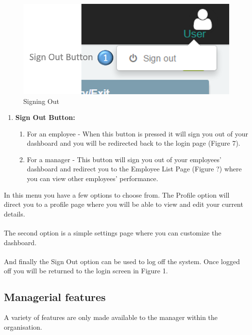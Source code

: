 \documentclass[11pt,a4paper]{article}
\begin{document}
\begin{figure}[H]
	\begin{center}
		\includegraphics[scale=0.7]{../Images/Getting_Started/logout_numbered}
		\caption{Signing Out}
	\end{center}
\end{figure}

\begin{enumerate}
	\item \textbf{Sign Out Button:}
		\begin{enumerate}
			\item For an employee - When this button is pressed it will sign you out of your dashboard and you will be redirected back to the login page (Figure 7).
			\item For a manager - This button will sign you out of your employees' dashboard and redirect you to the Employee List Page (Figure ?) where you can view other employees' performance.
		\end{enumerate} 
\end{enumerate}
\noindent
In this menu you have a few options to choose from. The Profile option will direct you to a profile page where you will be able to view and edit your current details. \\ \\
The second option is a simple settings page where you can customize the dashboard.\\ \\
And finally the Sign Out option can be used to log off the system. Once logged off you will be returned to the login screen in Figure 1.

\pagebreak

\subsection{Managerial features}
A variety of features are only made available to the manager within the organisation.
\end{document}
